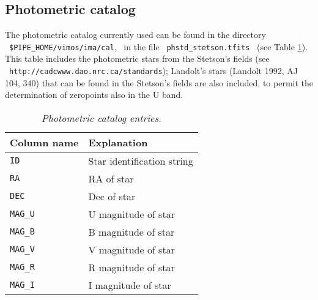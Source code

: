 \subsection{Photometric catalog} 

The photometric catalog currently used can be 
found in the directory  \ {\tt \$PIPE\_HOME/vimos/ima/cal}, 
\ in the file \ {\tt phstd\_stetson.tfits} \ (see Table \ref{STETSON}). 
This table includes the photometric stars from the Stetson's fields 
(see \ {\tt http://cadcwww.dao.nrc.ca/standards}); Landolt's stars 
(Landolt 1992, AJ 104, 340) that can be found in the Stetson's fields 
are also included, to permit the determination of zeropoints also in 
the U band.

\begin{table}[ht]
  \begin{center}
    \begin{tabular}{|l|l|}
    \hline
      {\bf Column name} & {\bf Explanation} \\
    \hline
      {\tt ID}       & Star identification string \\
      {\tt RA}       & RA of star \\
      {\tt DEC}      & Dec of star \\
      {\tt MAG\_U}   & U magnitude of star \\
      {\tt MAG\_B}   & B magnitude of star \\
      {\tt MAG\_V}   & V magnitude of star \\
      {\tt MAG\_R}   & R magnitude of star \\
      {\tt MAG\_I}   & I magnitude of star \\
    \hline
    \end{tabular}
    \caption{\it Photometric catalog entries.}
    \label{STETSON}
  \end{center}
\end{table}

\newpage


\newpage
